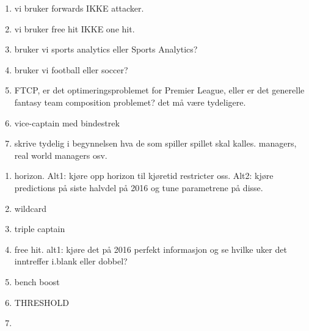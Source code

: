 \begin{enumerate}
    \item vi bruker forwards IKKE attacker. 
    \item vi bruker free hit IKKE one hit.
    \item bruker vi sports analytics eller Sports Analytics? 
    \item bruker vi football eller soccer? 
    \item FTCP, er det optimeringsproblemet for Premier League, eller er det generelle fantasy team composition problemet? det må være tydeligere. 
    \item vice-captain med bindestrek
    \item skrive tydelig i begynnelsen hva de som spiller spillet skal kalles. managers, real world managers osv.
\end{enumerate}


\begin{enumerate}
    \item horizon. Alt1: kjøre opp horizon til kjøretid restricter oss. Alt2: kjøre predictions på siste halvdel på 2016 og tune parametrene på disse. 
    \item wildcard 
    \item triple captain 
    \item free hit. alt1: kjøre det på 2016 perfekt informasjon og se hvilke uker det inntreffer i.blank eller dobbel?  
    \item bench boost
    \item THRESHOLD
    \item 
\end{enumerate}